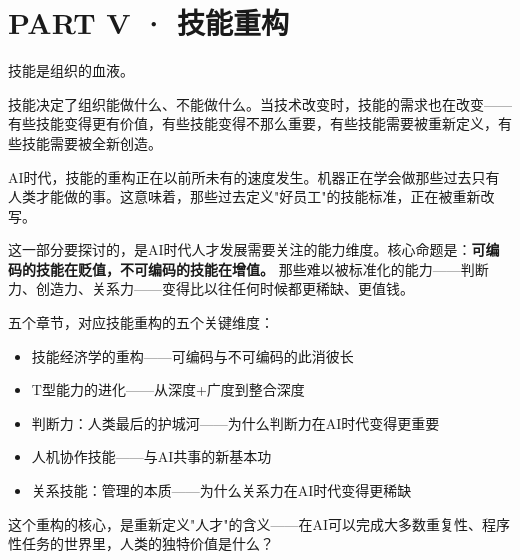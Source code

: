 \part{PART V · 技能重构}



技能是组织的血液。

技能决定了组织能做什么、不能做什么。当技术改变时，技能的需求也在改变——有些技能变得更有价值，有些技能变得不那么重要，有些技能需要被重新定义，有些技能需要被全新创造。

AI时代，技能的重构正在以前所未有的速度发生。机器正在学会做那些过去只有人类才能做的事。这意味着，那些过去定义"好员工"的技能标准，正在被重新改写。

这一部分要探讨的，是AI时代人才发展需要关注的能力维度。核心命题是：\textbf{可编码的技能在贬值，不可编码的技能在增值。} 那些难以被标准化的能力——判断力、创造力、关系力——变得比以往任何时候都更稀缺、更值钱。

五个章节，对应技能重构的五个关键维度：
\begin{itemize}
\item 技能经济学的重构——可编码与不可编码的此消彼长
\item T型能力的进化——从深度+广度到整合深度
\item 判断力：人类最后的护城河——为什么判断力在AI时代变得更重要
\item 人机协作技能——与AI共事的新基本功
\item 关系技能：管理的本质——为什么关系力在AI时代变得更稀缺

\end{itemize}
这个重构的核心，是重新定义"人才"的含义——在AI可以完成大多数重复性、程序性任务的世界里，人类的独特价值是什么？
